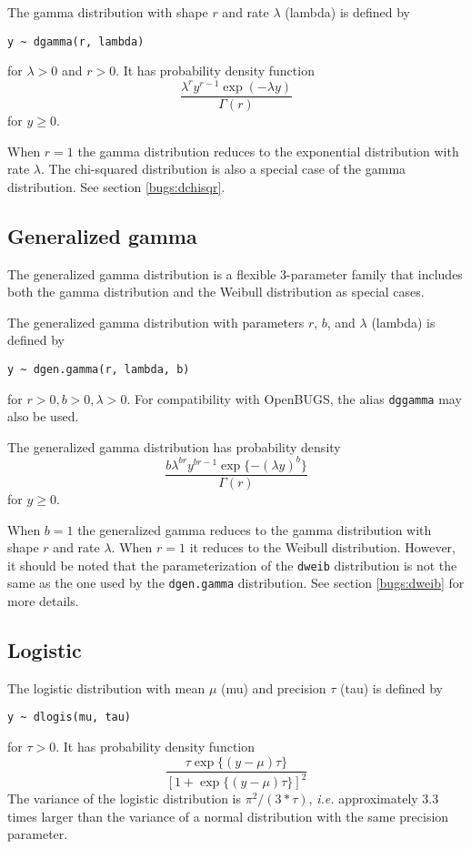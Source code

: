 \documentclass[11pt, a4paper, titlepage]{report}
\begin{document}
The gamma distribution with shape $r$ and rate $\lambda$ (lambda) is
defined by
\begin{verbatim}
y ~ dgamma(r, lambda)
\end{verbatim}
for $\lambda > 0$ and $r > 0$. It has probability density function
\[
\frac{\textstyle \lambda^r y^{r - 1} \exp(-\lambda y)}
     {\textstyle \Gamma(r)}
\]
for $y \geq 0$.

When $r=1$ the gamma distribution reduces to the exponential distribution
with rate $\lambda$. The chi-squared distribution is also a special case
of the gamma distribution. See section \ref{bugs:dchisqr}.

\subsection{Generalized gamma}      
\label{bugs:dgen.gamma}

The generalized gamma distribution is a flexible 3-parameter family
that includes both the gamma distribution and the Weibull distribution
as special cases.

The generalized gamma distribution with parameters $r$, $b$, and
$\lambda$ (lambda) is defined by
\begin{verbatim}
y ~ dgen.gamma(r, lambda, b)
\end{verbatim}
for $r > 0, b > 0, \lambda > 0$. For compatibility with OpenBUGS, the
alias \texttt{dggamma} may also be used.

The generalized gamma distribution has probability density
\[
\frac{\textstyle b \lambda^{b r} y^{b r - 1}  \exp\{-(\lambda y)^{b}\}}
     {\textstyle \Gamma(r)}
\]
for $y \geq 0$.

When $b=1$ the generalized gamma reduces to the gamma distribution
with shape $r$ and rate $\lambda$. When $r=1$ it reduces to the
Weibull distribution. However, it should be noted that the
parameterization of the \texttt{dweib} distribution is not the same as
the one used by the \texttt{dgen.gamma} distribution. See section
\ref{bugs:dweib} for more details.

\subsection{Logistic}
\label{bugs:dlogis}

The logistic distribution with mean $\mu$ (mu) and precision $\tau$ (tau) is
defined by
\begin{verbatim}
y ~ dlogis(mu, tau)
\end{verbatim}
for $\tau > 0$. It has probability density function
\[
\frac{\textstyle \tau \exp\{(y - \mu) \tau\}}
     {\textstyle  \left[1 + \exp\{(y - \mu) \tau\}\right]^2}
\]   
The variance of the logistic distribution is $\pi^2/(3*\tau)$, {\em
  i.e.} approximately 3.3 times larger than the variance of a normal
distribution with the same precision parameter.
\end{document}
